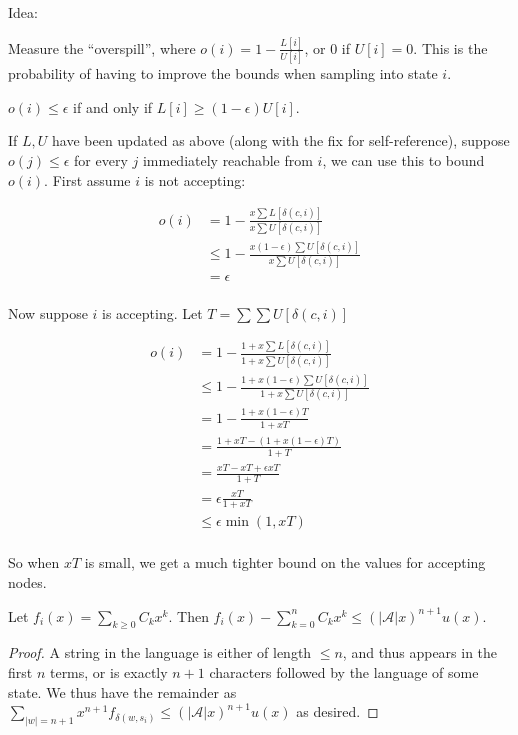 Idea:

Measure the ``overspill'', where \(o(i) = 1 - \frac{L[i]}{U[i]}\), or \(0\) if \(U[i] = 0\).
This is the probability of having to improve the bounds when sampling into state \(i\).

\(o(i) \leq \epsilon\) if and only if \(L[i] \geq (1 - \epsilon)U[i]\).

If \(L, U\) have been updated as above (along with the fix for self-reference),
suppose \(o(j) \leq \epsilon\) for every \(j\) immediately reachable from \(i\),
we can use this to bound \(o(i)\).
First assume \(i\) is not accepting:

\begin{align*}
o(i) &= 1 - \frac{x \sum L[\delta(c, i)]}{x \sum U[\delta(c, i)]} \\
&\leq 1 - \frac{x (1 - \epsilon) \sum U[\delta(c, i)]}{x \sum U[\delta(c, i)]} \\
&= \epsilon\\
\end{align*}

Now suppose \(i\) is accepting.
Let \(T = \sum \sum U[\delta(c, i)]\)

\begin{align*}
o(i) &= 1 - \frac{1 + x \sum L[\delta(c, i)]}{1 + x \sum U[\delta(c, i)]} \\
&\leq 1 - \frac{1 + x (1 - \epsilon) \sum U[\delta(c, i)]}{1 + x \sum U[\delta(c, i)]} \\
&= 1 - \frac{1 + x (1 - \epsilon) T}{1 + x T}\\
&= \frac{1 + x T - (1 + x (1 - \epsilon) T)}{1 + T}\\
&= \frac{x T - x T + \epsilon x T}{1 + T}\\
&= \epsilon \frac{x T}{1 + x T}\\
&\leq \epsilon \min(1, xT)\\
\end{align*}

So when \(xT\) is small,
we get a much tighter bound on the values for accepting nodes.

\begin{proposition}
Let \(f_i(x) = \sum\limits_{k \geq 0} C_k x^k\).
Then \(f_i(x) - \sum\limits_{k = 0}^n C_k x^k \leq {(|\mathcal{A}|x)}^{n + 1} u(x)\).
\end{proposition}

\begin{proof}
A string in the language is either of length \(\leq n\),
and thus appears in the first \(n\) terms,
or is exactly \(n + 1\) characters followed by the language of some state.
We thus have the remainder as \(\sum\limits_{|w| = n + 1} x^{n + 1} f_{\delta(w, s_i)} \leq {(|\mathcal{A}|x)}^{n + 1} u(x)\) as desired.
\end{proof}

